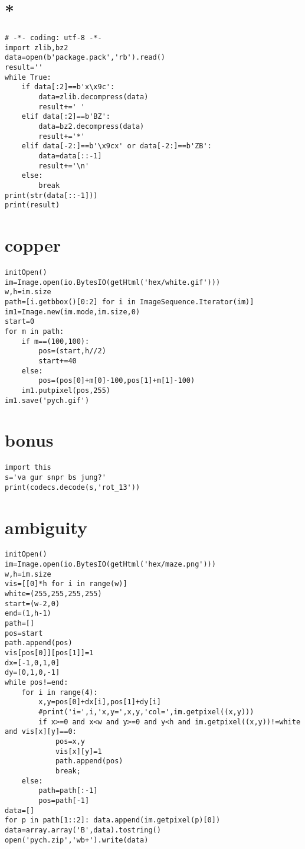 \documentclass[onecolumn,a4paper,12pt]{article}
\begin{document}
\section{*}
\begin{lstlisting}
# -*- coding: utf-8 -*-
import zlib,bz2
data=open(b'package.pack','rb').read()
result=''
while True:
    if data[:2]==b'x\x9c':
        data=zlib.decompress(data)
        result+=' '
    elif data[:2]==b'BZ':
        data=bz2.decompress(data)
        result+='*'
    elif data[-2:]==b'\x9cx' or data[-2:]==b'ZB':
        data=data[::-1]
        result+='\n'
    else:
        break
print(str(data[::-1]))
print(result)
\end{lstlisting}

\section{copper}
\begin{lstlisting}
initOpen()
im=Image.open(io.BytesIO(getHtml('hex/white.gif')))
w,h=im.size
path=[i.getbbox()[0:2] for i in ImageSequence.Iterator(im)]
im1=Image.new(im.mode,im.size,0)
start=0
for m in path:
    if m==(100,100):
        pos=(start,h//2)
        start+=40
    else:
        pos=(pos[0]+m[0]-100,pos[1]+m[1]-100)
    im1.putpixel(pos,255)
im1.save('pych.gif')
\end{lstlisting}

\section{bonus}
\begin{lstlisting}
import this
s='va gur snpr bs jung?'
print(codecs.decode(s,'rot_13'))
\end{lstlisting}

\section{ambiguity}
\begin{lstlisting}
initOpen()
im=Image.open(io.BytesIO(getHtml('hex/maze.png')))
w,h=im.size
vis=[[0]*h for i in range(w)]
white=(255,255,255,255)
start=(w-2,0)
end=(1,h-1)
path=[]
pos=start
path.append(pos)
vis[pos[0]][pos[1]]=1
dx=[-1,0,1,0]
dy=[0,1,0,-1]
while pos!=end:
    for i in range(4):
        x,y=pos[0]+dx[i],pos[1]+dy[i]
        #print('i=',i,'x,y=',x,y,'col=',im.getpixel((x,y)))
        if x>=0 and x<w and y>=0 and y<h and im.getpixel((x,y))!=white and vis[x][y]==0:
            pos=x,y
            vis[x][y]=1
            path.append(pos)
            break;
    else:
        path=path[:-1]
        pos=path[-1]
data=[]
for p in path[1::2]: data.append(im.getpixel(p)[0])
data=array.array('B',data).tostring()
open('pych.zip','wb+').write(data)
\end{lstlisting}
\end{document}
